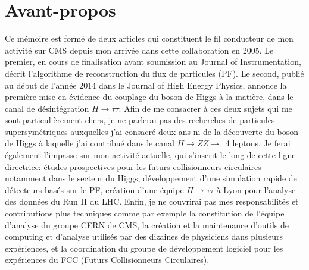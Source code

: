 \section*{Avant-propos}

Ce mémoire est formé de deux articles qui constituent le fil conducteur de mon activité sur CMS depuis mon arrivée dans cette collaboration en 2005. 
Le premier, en cours de finalisation avant soumission au Journal of Instrumentation, décrit l'algorithme de reconstruction du flux de particules (PF).
Le second, publié au début de l'année 2014 dans le Journal of High Energy Physics, annonce la première mise en évidence du couplage du boson de Higgs à la matière, dans le canal de désintégration $H \rightarrow \tau \tau$. 
Afin de me consacrer à ces deux sujets qui me sont particulièrement chers, 
je ne parlerai pas des recherches de particules supersymétriques auxquelles j'ai consacré deux ans
ni de la découverte du boson de Higgs à laquelle j'ai contribué dans le canal $H \rightarrow ZZ \rightarrow$~4 leptons. 
Je ferai également l'impasse sur mon activité actuelle, qui s'inscrit le long de cette ligne directrice: études prospectives pour les futurs collisionneurs circulaires notamment dans le secteur du Higgs, développement d'une simulation rapide de détecteurs basés sur le PF, 
création d'une équipe $H \rightarrow \tau \tau$ à Lyon pour l'analyse des données du Run II du LHC.
Enfin, je ne couvrirai pas mes responsabilités et contributions plus techniques comme par exemple la constitution de l'équipe d'analyse du groupe CERN de CMS, la création et la maintenance d'outils de computing et d'analyse utilisés par des dizaines de physiciens dans plusieurs expériences, et la coordination du groupe de développement logiciel pour les expériences du FCC (Futurs Collisionneurs Circulaires). 

